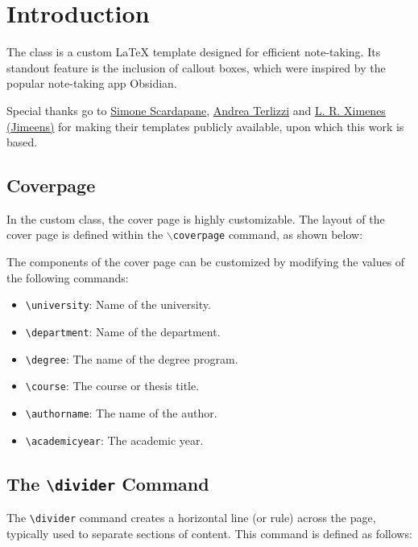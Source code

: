 \documentclass{laxidian}
\begin{document}
    \chapter{Introduction}

The \laxidian class is a custom LaTeX template designed for efficient note-taking. Its standout feature is the inclusion of callout boxes, which were inspired by the popular note-taking app Obsidian.

    Special thanks go to \href{https://www.sscardapane.it/}{Simone Scardapane}, \href{https://it.linkedin.com/in/andrea-terlizzi-4ba891263}{Andrea Terlizzi} and \href{https://github.com/Jimeens}{L. R. Ximenes (Jimeens)} for making their templates publicly available, upon which this work is based.

    \section{Coverpage}

    In the custom \laxidian class, the cover page is highly customizable. The layout of the cover page is defined within the \texttt{$\backslash$coverpage} command, as shown below:

    The components of the cover page can be customized by modifying the values of the following commands:

    \begin{itemize}
        \item \texttt{\textbackslash university}: Name of the university.
        \item \texttt{\textbackslash department}: Name of the department.
        \item \texttt{\textbackslash degree}: The name of the degree program.
        \item \texttt{\textbackslash course}: The course or thesis title.
        \item \texttt{\textbackslash authorname}: The name of the author.
        \item \texttt{\textbackslash academicyear}: The academic year.
    \end{itemize}

    \section{The \texttt{\textbackslash divider} Command}

    The \texttt{\textbackslash divider} command creates a horizontal line (or rule) across the page, typically used to separate sections of content. This command is defined as follows:
\end{document}
